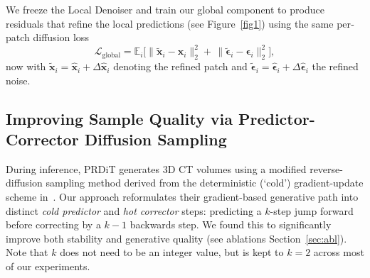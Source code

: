 We freeze the Local Denoiser and train our global component to produce residuals that refine the local predictions (see Figure~\ref{fig1}) using the same per‐patch diffusion loss
\begin{equation}
  \mathcal{L}_\mathrm{global}
  = \mathbb{E}_{i}\bigl[\|\tilde{\boldsymbol{x}}_i - \boldsymbol{x}_i\|_2^2 + \,\|\tilde{\boldsymbol{\epsilon}}_i - \boldsymbol{\epsilon}_i\|_2^2\bigr],
\end{equation}
now with $\tilde{\boldsymbol{x}}_i = \hat{\boldsymbol{x}}_i + \Delta\hat{\boldsymbol{x}}_i$ denoting the refined patch and $\tilde{\boldsymbol{\epsilon}}_i = \hat{\boldsymbol{\epsilon}}_i + \Delta\hat{\boldsymbol{\epsilon}}_i$ the refined noise.  


\subsection{Improving Sample Quality via Predictor-Corrector Diffusion Sampling}
\label{m3}
During inference, PRDiT generates 3D CT volumes using a modified reverse-diffusion sampling method derived from the deterministic (`cold') gradient-update scheme in~\citep{zhang2023improving}. Our approach reformulates their gradient-based generative path into distinct \emph{cold predictor} and \emph{hot corrector} steps: predicting a $k$-step jump forward before correcting by a $k-1$ backwards step. We found this to significantly improve both stability and generative quality (see ablations Section~\ref{sec:abl}). Note that $k$ does not need to be an integer value, but is kept to $k=2$ across most of our experiments.

